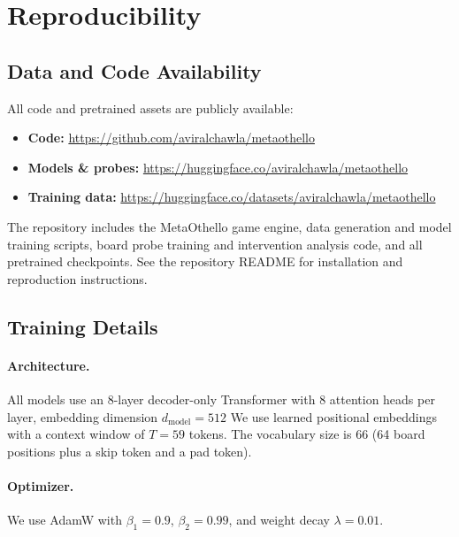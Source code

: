 \documentclass{article}
\theoremstyle{plain}
\theoremstyle{definition}
\theoremstyle{remark}
\begin{document}



\newpage
\appendix
\onecolumn
\section{Reproducibility}
\label{app:reproducibility}

\subsection{Data and Code Availability}
  \label{app:code}

  All code and pretrained assets are publicly available:
  \begin{itemize}
      \item \textbf{Code:} \url{https://github.com/aviralchawla/metaothello}
      \item \textbf{Models \& probes:} \url{https://huggingface.co/aviralchawla/metaothello}
      \item \textbf{Training data:} \url{https://huggingface.co/datasets/aviralchawla/metaothello}
  \end{itemize}
  The repository includes the MetaOthello game engine, data generation and model training scripts, board probe training and intervention analysis code, and all pretrained checkpoints. See
   the repository README for installation and reproduction instructions.

\subsection{Training Details}
\label{app:training}

\paragraph{Architecture.} All models use an 8-layer decoder-only Transformer with 8 attention heads per layer, embedding dimension $d_{\text{model}} = 512$ We use learned positional embeddings with a context window of $T = 59$ tokens. The vocabulary size is 66 (64 board positions plus a skip token and a pad token).

\paragraph{Optimizer.} We use AdamW \citep{loshchilov_decoupled_2019} with $\beta_1 = 0.9$, $\beta_2 = 0.99$, and weight decay $\lambda = 0.01$.
\end{document}
